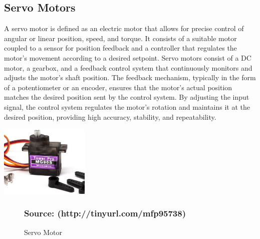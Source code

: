 \documentclass[12pt,a4paper]{report}
\begin{document}
	
	\subsection{Servo Motors}
	\begin{justify}
		A servo motor is defined as an electric motor that allows for precise control of angular or linear position, speed, and torque. It consists of a suitable motor coupled to a sensor for position feedback and a controller that regulates the motor’s movement according to a desired setpoint. Servo motors consist of a DC motor, a gearbox, and a feedback control system that continuously monitors and adjusts the motor's shaft position. The feedback mechanism, typically in the form of a potentiometer or an encoder, ensures that the motor's actual position matches the desired position sent by the control system. By adjusting the input signal, the control system regulates the motor's rotation and maintains it at the desired position, providing high accuracy, stability, and repeatability. 
	\end{justify}
	
	\begin{center}
		
		\includegraphics[width=0.32\textwidth]{images//servo_motor.jpg} 
		
		
		\begin{figure}[ht]
			
			
			\caption{Servo Motor}
			\subsubsection{Source: (http://tinyurl.com/mfp95738)}
		\end{figure}
		
	\end{center}
	
	

	
\end{document}
